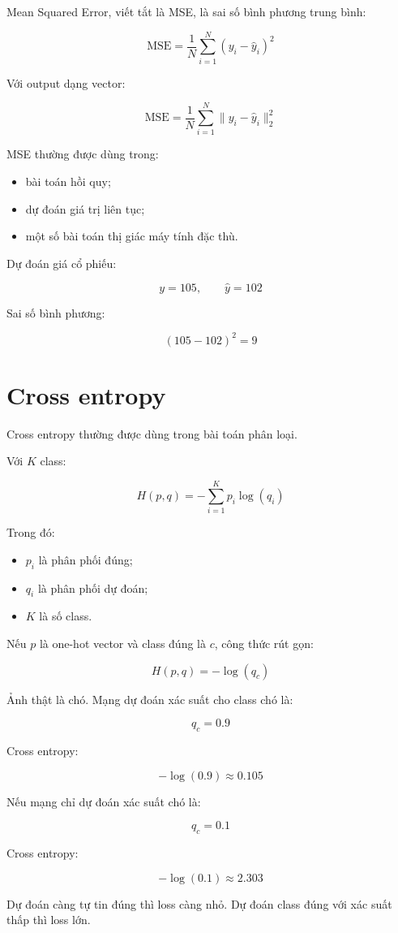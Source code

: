 \documentclass[12pt,a4paper]{report}
\begin{document}
Mean Squared Error, viết tắt là MSE, là sai số bình phương trung bình:

\[
    \text{MSE}
    =
    \frac{1}{N}
    \sum_{i=1}^{N}
    (y_i-\hat{y}_i)^2
\]

Với output dạng vector:

\[
    \text{MSE}
    =
    \frac{1}{N}
    \sum_{i=1}^{N}
    \|y_i-\hat{y}_i\|_2^2
\]

MSE thường được dùng trong:

\begin{itemize}
    \item bài toán hồi quy;
    \item dự đoán giá trị liên tục;
    \item một số bài toán thị giác máy tính đặc thù.
\end{itemize}

\begin{vidu}
Dự đoán giá cổ phiếu:

\[
    y = 105,\qquad \hat{y}=102
\]

Sai số bình phương:

\[
    (105-102)^2=9
\]
\end{vidu}

\section{Cross entropy}

Cross entropy thường được dùng trong bài toán phân loại.

Với $K$ class:

\[
    H(p,q)
    =
    -\sum_{i=1}^{K}p_i\log(q_i)
\]

Trong đó:

\begin{itemize}
    \item $p_i$ là phân phối đúng;
    \item $q_i$ là phân phối dự đoán;
    \item $K$ là số class.
\end{itemize}

Nếu $p$ là one-hot vector và class đúng là $c$, công thức rút gọn:

\[
    H(p,q)=-\log(q_c)
\]

\begin{vidu}
Ảnh thật là chó. Mạng dự đoán xác suất cho class chó là:

\[
    q_c=0.9
\]

Cross entropy:

\[
    -\log(0.9)\approx 0.105
\]

Nếu mạng chỉ dự đoán xác suất chó là:

\[
    q_c=0.1
\]

Cross entropy:

\[
    -\log(0.1)\approx 2.303
\]

Dự đoán càng tự tin đúng thì loss càng nhỏ. Dự đoán class đúng với xác suất thấp thì loss lớn.
\end{vidu}
\end{document}
